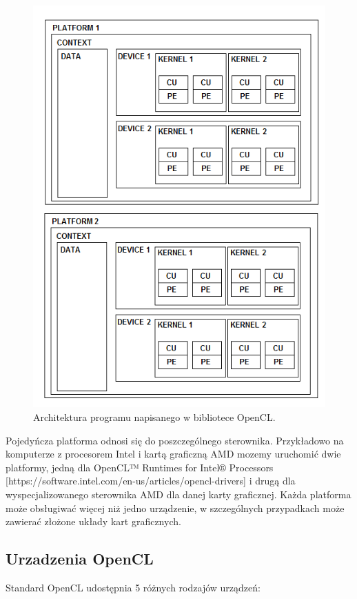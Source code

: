\begin{figure}[h]
        \centering
                \centering
                \includegraphics[width=12cm]{rys8}
	\caption{Architektura programu napisanego w bibliotece OpenCL.}
\end{figure}

Pojedyńcza platforma odnosi się do poszczególnego sterownika. Przykładowo na komputerze z procesorem Intel i kartą graficzną AMD mozemy uruchomić dwie platformy, jedną dla OpenCL™ Runtimes for Intel® Processors [https://software.intel.com/en-us/articles/opencl-drivers] i drugą dla wyspecjalizowanego sterownika AMD dla danej karty graficznej. Każda platforma może obsługiwać więcej niż jedno urządzenie, w szczególnych przypadkach może zawierać złożone układy kart graficznych.

\subsection{Urzadzenia OpenCL}\label{sec:OpenC21L}

Standard OpenCL udostępnia 5 różnych rodzajów urządzeń:

